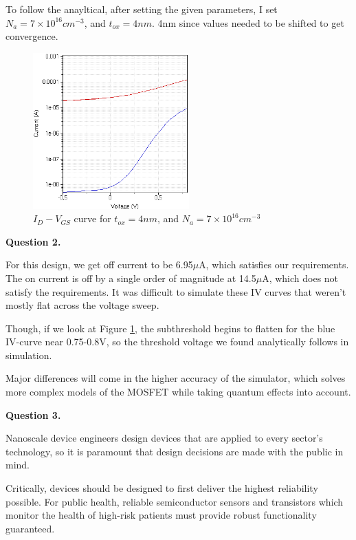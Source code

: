 \documentclass{IEEEtran}
\begin{document}
To follow the anayltical, after setting the given parameters, I set \(N_a = 7\times10^{16}cm^{-3}\), and \(t_{ox}=4nm\). 4nm since values needed to be shifted to get convergence.

\begin{figure}[!ht] 
    \centering
    \includegraphics*[width = 6cm]{4nm-5e18-idvg.png}
    \caption{\(I_D-V_{GS}\) curve for \(t_{ox}=4nm\), and \(N_a=7\times10^{16}cm^{-3}\)}
    \label{fig:idvgs}
\end{figure}    

\textbf{Question 2.}

\smallskip

For this design, we get off current to be 6.95\(\mu\)A, which satisfies our requirements. The on current is off by a single order of magnitude at 14.5\(\mu\)A, which does not satisfy the requirements. It was difficult to simulate these IV curves that weren't mostly flat across the voltage sweep.

Though, if we look at Figure \ref{fig:idvgs}, the subthreshold begins to flatten for the blue IV-curve near 0.75-0.8V, so the threshold voltage we found analytically follows in simulation.

Major differences will come in the higher accuracy of the simulator, which solves more complex models of the MOSFET while taking quantum effects into account.

\textbf{Question 3.}

\smallskip

Nanoscale device engineers design devices that are applied to every sector's technology, so it is paramount that design decisions are made with the public in mind. 

Critically, devices should be designed to first deliver the highest reliability possible. For public health, reliable semiconductor sensors and transistors which monitor the health of high-risk patients must provide robust functionality guaranteed. 
\end{document}
